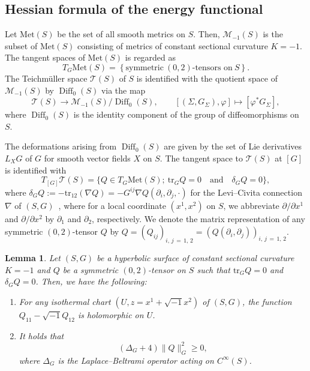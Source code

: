 \documentclass[11pt]{article}
\newtheorem{lemm}[theo]{Lemma}
\theoremstyle{definition}
\newcommand{\Mc}{\mathcal{M}}
\numberwithin{equation}{section}
\renewcommand{\SS}{\Sigma}
\newcommand{\p}{\psi}
\renewcommand{\Mc}{\mathcal{M}}
\newcommand{\Tc}{\mathcal{T}}
\newcommand*\tr{\mathrm{tr}}
\newcommand*\Met{\mathrm{Met}}
\DeclareMathOperator{\Diff}{Diff}
\renewcommand*\p{\partial}
\newcommand*{\romanenumi}{\renewcommand*{\theenumi}{\roman{enumi}}}
\begin{document}
\subsection{Hessian formula of the energy functional}\label{ss1}


Let $\Met(S)$ be the set of all smooth metrics on $S$. Then, $\Mc_{-1}(S)$ is the subset of $\Met(S)$ consisting of metrics of constant sectional curvature $K=-1$. The tangent spaces of $\Met(S)$ is regarded as
\[
T_G\Met(S)=\left\{\text{symmetric}\ (0,2)\text{-tensors on}\ S\right\}.
\]
The {Teichm\"uller space} $\Tc(S)$ of $S$ is identified with the quotient space of $\Mc_{-1}(S)$ by ${\Diff}_0(S)$ via the map
\[
\Tc(S) \to \Mc_{-1}(S)/{\Diff}_0(S), \qquad \left[\left(\Sigma, G_\SS\right), \varphi\right]\mapsto \left[\varphi^\ast G_\SS\right],
\]
where ${\Diff}_0(S)$ is the identity component of the group of diffeomorphisms on $S$.



The deformations arising from ${\Diff}_0(S)$ are given by the set of Lie derivatives $L_XG$ of $G$ for smooth vector fields $X$ on $S$. The tangent space to $\Tc(S)$ at $[G]$ is identified with
\[
T_{[G]}\Tc(S)=\big\{Q\in T_G\Met(S);\ \tr_GQ=0\quad \text{and}\quad \delta_GQ=0\big\},
\]
where $\delta_GQ:=-{\tr}_{12}(\nabla Q)=-G^{ij}\nabla{Q}(\p_i,\p_j, \cdot)$ for the Levi--Civita connection $\nabla$ of $(S, G)$~\cite[Section~3.2]{Yamada2}, where for a local coordinate $(x^1,x^2)$ on $S$, we abbreviate $\p/\p x^1$ and $\p/\p x^2$ by $\p_1$ and $\p_2$, respectively. We denote the matrix representation of any symmetric $(0,2)$-tensor $Q$ by $Q=(Q_{ij})_{i,\,j\,=\,1,\,2}=(Q(\p_i,\p_j))_{i,\,j\,=\,1,\,2}$.

\begin{lemm}\label{Lem:Qholomorphic}
Let $(S,G)$ be a hyperbolic surface of constant sectional curvature $K=-1$ and $Q$ be a symmetric $(0,2)$-tensor on $S$ such that ${\tr}_G Q=0$ and $\delta_GQ=0$. Then, we have the following:
\begin{enumerate}\romanenumi
\item\label{lemm3.1.1} For any isothermal chart $(U, z=x^1+\sqrt{-1}x^2)$ of $(S,G)$, the function $Q_{11}-\sqrt{-1}Q_{12}$ is holomorphic on $U$.
\item\label{lemm3.1.2} It holds that
\[
\left(\Delta_G+4\right)\|Q\|^2_G\geq 0,
\]
where $\Delta_G$ is the Laplace--Beltrami operator acting on $C^{\infty}(S)$.
\end{enumerate}
\end{lemm}
\end{document}
